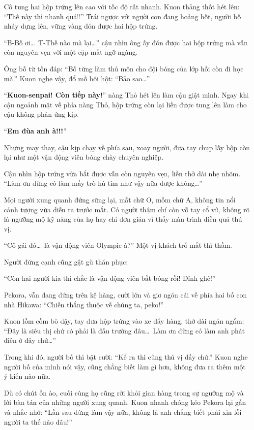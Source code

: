 \documentclass[../main.tex]{subfiles}
\begin{document}
Cô tung hai hộp trứng lên cao với tốc độ rất nhanh. Kuon thảng thốt hét lên: ``Thế này thì nhanh quá!!'' Trái ngược với người con đang hoảng hốt, người bố nhảy dựng lên, vững vàng đón được hai hộp trứng.

``B-Bố ơi\dots\ T-Thế nào mà lại\dots'' cậu nhìn ông ấy đón được hai hộp trứng mà vẫn còn nguyên vẹn với một cặp mắt ngỡ ngàng.

Ông bố từ tốn đáp: ``Bố từng làm thủ môn cho đội bóng của lớp hồi còn đi học mà.'' Kuon nghe vậy, đổ mồ hôi hột: ``Bảo sao\dots''

``\textbf{Kuon-senpai! Còn tiếp này!}'' nàng Thỏ hét lên làm cậu giật mình. Ngay khi cậu ngoảnh mặt về phía nàng Thỏ, hộp trứng còn lại liền được tung lên làm cho cậu không phản ứng kịp.

``\textbf{Em đùa anh à!!!}''

Nhưng may thay, cậu kịp chạy về phía sau, xoay người, đưa tay chụp lấy hộp còn lại như một vận động viên bóng chày chuyên nghiệp.

Cậu nhìn hộp trứng vừa bắt được vẫn còn nguyên vẹn, liền thở dài nhẹ nhõm. ``Làm ơn đừng có làm mấy trò hú tim như vậy nữa được không\dots''

Mọi người xung quanh đứng sững lại, mắt chữ O, mồm chữ A, không tin nổi cảnh tượng vừa diễn ra trước mắt. Có người thậm chí còn vỗ tay cổ vũ, không rõ là ngưỡng mộ kỹ năng của họ hay chỉ đơn giản vì thấy màn trình diễn quá thú vị.

    {\color{red}``Cô gái đó\dots\ là vận động viên Olympic à?}'' Một vị khách trố mắt thì thầm.

Người đứng cạnh cũng gật gù thán phục:

{\color{red}``Còn hai người kia thì chắc là vận động viên bắt bóng rồi! Đỉnh ghê!}''

Pekora, vẫn đang đứng trên kệ hàng, cười lớn và giơ ngón cái về phía hai bố con nhà Hikawa: ``Chiến thắng thuộc về chúng ta, peko!''

Kuon lồm cồm bò dậy, tay đưa hộp trứng vào xe đẩy hàng, thở dài ngán ngẩm: ``Đây là siêu thị chứ có phải là đấu trường đâu\dots\ Làm ơn đừng có làm anh phát điên ở đây chứ\dots''

Trong khi đó, người bố thì bật cười: ``Kể ra thì cũng thú vị đấy chứ.'' Kuon nghe người bố của mình nói vậy, cũng chẳng biết làm gì hơn, không đưa ra thêm một ý kiến nào nữa.

Dù có chút ồn ào, cuối cùng họ cũng rời khỏi gian hàng trong sự ngưỡng mộ và lời bàn tán của những người xung quanh. Kuon nhanh chóng kéo Pekora lại gần và nhắc nhở: ``Lần sau đừng làm vậy nữa, không là anh chẳng biết phải xin lỗi người ta thế nào đâu!''
\end{document}
